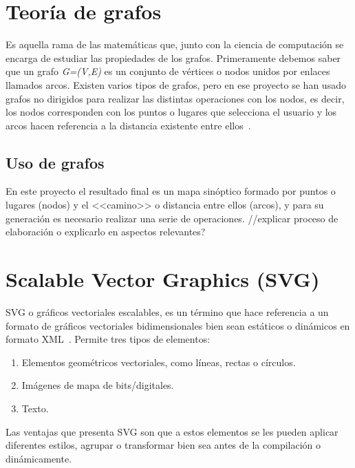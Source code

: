 \section{Teoría de grafos}
Es aquella rama de las matemáticas que, junto con la ciencia de computación se encarga de estudiar las propiedades de los grafos. Primeramente debemos saber que un grafo \textit{G=(V,E)} es un conjunto de vértices o nodos unidos por enlaces llamados arcos.
Existen varios tipos de grafos, pero en ese proyecto se han usado grafos no dirigidos para realizar las distintas operaciones con los nodos, es decir, los nodos corresponden con los puntos o lugares que selecciona el usuario y los arcos hacen referencia a la distancia existente entre ellos~\cite{wiki:tgrafos}. 

\subsection{Uso de grafos}
En este proyecto el resultado final es un mapa sinóptico formado por puntos o lugares (nodos) y el <<camino>> o distancia entre ellos (arcos), y para su generación es necesario realizar una serie de operaciones. 
//explicar proceso de elaboración o explicarlo en aspectos relevantes?


\section{Scalable Vector Graphics (SVG)}
SVG o gráficos vectoriales escalables, es un término que hace referencia a un formato de gráficos vectoriales bidimensionales bien sean estáticos o dinámicos en formato XML~\cite{wiki:xml}.
Permite tres tipos de elementos:
\begin{enumerate}
	\item Elementos geométricos vectoriales, como líneas, rectas o círculos.
	\item Imágenes de mapa de bits/digitales.
	\item Texto.
\end{enumerate}

Las ventajas que presenta SVG son que a estos elementos se les pueden aplicar diferentes estilos, agrupar o transformar bien sea antes de la compilación o dinámicamente. 

